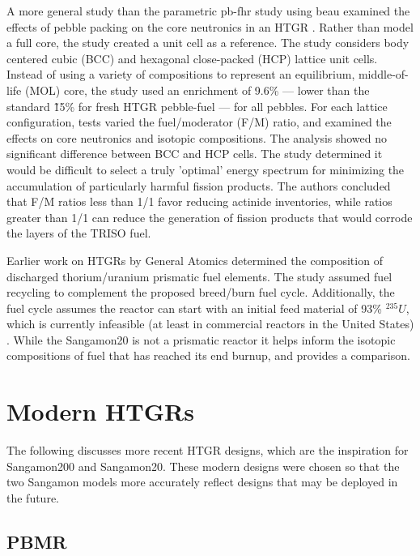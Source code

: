 A more general study than the parametric \acrshort{pb-fhr} study using \acrshort{beau} examined the effects of pebble packing on the core neutronics in an HTGR \cite{turkmen_effect_2012}.  Rather than model a full core, the study created a unit cell as a reference.  The study considers body centered cubic (BCC) and hexagonal close-packed (HCP) lattice unit cells.  Instead of using a variety of compositions to represent an equilibrium, middle-of-life (MOL) core, the study used an enrichment of 9.6\%  --- lower than the standard \~15\% for fresh HTGR pebble-fuel --- for all pebbles.  For each lattice configuration, tests varied the fuel/moderator (F/M) ratio, and examined the effects on core neutronics and isotopic compositions.  The analysis showed no significant difference between BCC and HCP cells.  The study determined it would be difficult to select a truly 'optimal' energy spectrum for minimizing the accumulation of particularly harmful fission products.  The authors concluded that F/M ratios less than 1/1 favor reducing actinide inventories, while ratios greater than 1/1 can reduce the generation of fission products that would corrode the layers of the TRISO fuel.

Earlier work on HTGRs by General Atomics determined the composition of discharged thorium/uranium prismatic fuel elements.  The study assumed fuel recycling to complement the proposed breed/burn fuel cycle.  Additionally, the fuel cycle assumes the reactor can start with an initial feed material of 93\% $^{235}U$, which is currently infeasible (at least in commercial reactors in the United States) \cite{hamilton_htgr_1976}.  While the Sangamon20 is not a prismatic reactor it helps inform the isotopic compositions of fuel that has reached its end burnup, and provides a comparison.


\section{Modern HTGRs}
\label{sec:modern}

The following discusses more recent HTGR designs, which are the inspiration for Sangamon200 and Sangamon20.  These modern designs were chosen so that the two Sangamon models more accurately reflect designs that may be deployed in the future.

\subsection{PBMR}

